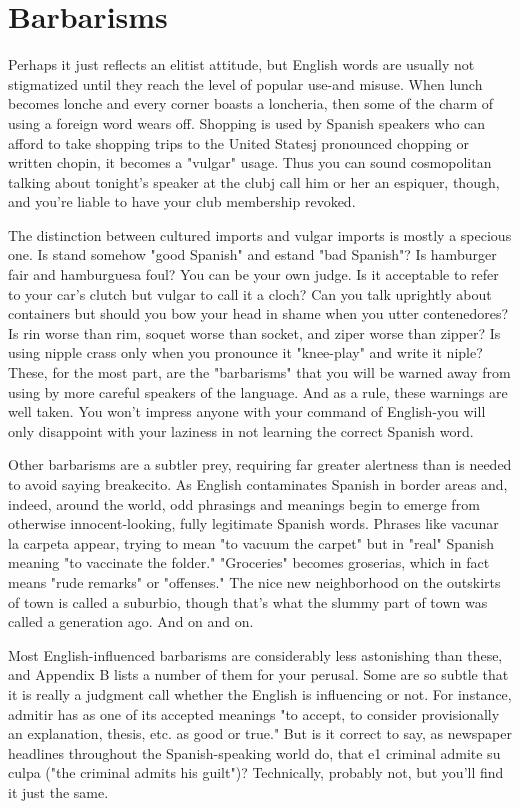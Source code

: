 \documentclass[14pt,a4paper,oneside]{memoir}
\begin{document}
{{{{\section{Barbarisms}

Perhaps it just reflects an elitist attitude, but English words
are usually not stigmatized until they reach the level of popular
use-and misuse. When lunch becomes lonche and every corner
boasts a loncheria, then some of the charm of using a foreign word
wears off. Shopping is used by Spanish speakers who can afford to take
shopping trips to the United Statesj pronounced chopping or written
chopin, it becomes a "vulgar" usage. Thus you can sound cosmopolitan talking about tonight's speaker at the clubj call him or her an espiquer, though, and you're liable to have your club membership revoked.

The distinction between cultured imports and vulgar imports is mostly a specious one. Is stand somehow "good Spanish" and
estand "bad Spanish"? Is hamburger fair and hamburguesa foul? You
can be your own judge. Is it acceptable to refer to your car's clutch but
vulgar to call it a cloch? Can you talk uprightly about containers but
should you bow your head in shame when you utter contenedores? Is
rin worse than rim, soquet worse than socket, and ziper worse than
zipper? Is using nipple crass only when you pronounce it "knee-play"
and write it niple? These, for the most part, are the "barbarisms" that
you will be warned away from using by more careful speakers of the
language. And as a rule, these warnings are well taken. You won't impress anyone with your command of English-you will only disappoint
with your laziness in not learning the correct Spanish word.

Other barbarisms are a subtler prey, requiring far greater alertness than is needed to avoid saying breakecito. As English contaminates Spanish in border areas and, indeed, around the world, odd phrasings and meanings begin to emerge from otherwise innocent-looking,
fully legitimate Spanish words. Phrases like vacunar la carpeta appear,
trying to mean "to vacuum the carpet" but in "real" Spanish meaning
"to vaccinate the folder." "Groceries" becomes groserias, which in
fact means "rude remarks" or "offenses." The nice new neighborhood
on the outskirts of town is called a suburbio, though that's what the
slummy part of town was called a generation ago. And on and on.

Most English-influenced barbarisms are considerably less astonishing than these, and Appendix B lists a number of them for your
perusal. Some are so subtle that it is really a judgment call whether
the English is influencing or not. For instance, admitir has as one of
its accepted meanings "to accept, to consider provisionally an explanation, thesis, etc. as good or true." But is it correct to say, as newspaper
headlines throughout the Spanish-speaking world do, that e1 criminal
admite su culpa ("the criminal admits his guilt")? Technically, probably not, but you'll find it just the same.

}}}}
\end{document}
